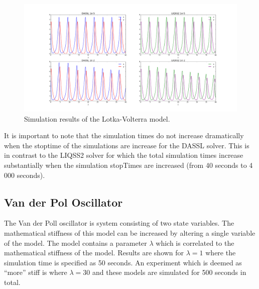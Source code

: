 \documentclass[10pt]{article}
\begin{document}
    \begin{figure}[htbp]\centering
   \includegraphics[scale=0.32, clip,trim={50mm 1mm 45mm 10mm}]{./Fig/LV.png}
\vspace{-0.8cm}
\caption{Simulation results of the Lotka-Volterra model.}\label{Fig3}
\end{figure}

It is important to note that the simulation times do not increase dramatically when the stoptime of the simulations are increase for the DASSL solver. This is in contrast to the LIQSS2 solver for which the total simulation times increase substantially when the simulation stopTimes are increased (from 40 seconds to 4\,000 seconds).

\newpage

\subsection{Van der Pol Oscillator}

The Van der Poll oscillator is system consisting of two state variables. The mathematical stiffness of this model can be increased by altering a single variable of the model. The model contains a parameter $\lambda$ which is correlated to the mathematical stiffness of the model. Results are shown for $\lambda=1$ where the simulation time is specified as 50 seconds. An experiment which is deemed as ``more'' stiff is where $\lambda=30$ and these models are simulated for 500 seconds in total.
\end{document}
